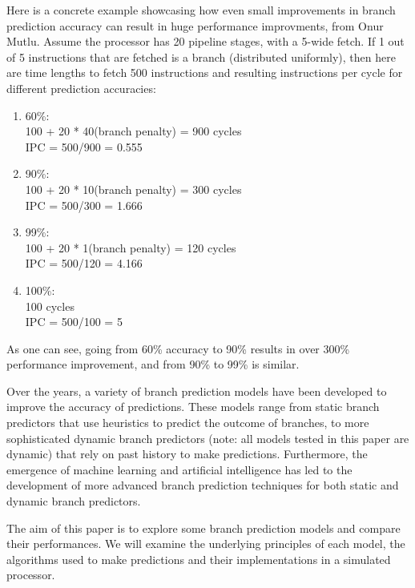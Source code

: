 \documentclass[conference]{IEEEtran}
\begin{document}
Here is a concrete example showcasing how even small improvements in branch prediction accuracy can result in huge performance improvments, from Onur Mutlu\cite{mutlu2023}. Assume the processor has 20 pipeline stages, with a 5-wide fetch. If 1 out of 5 instructions that are fetched is a branch (distributed uniformly), then here are time lengths to fetch 500 instructions and resulting instructions per cycle for different prediction accuracies:
\begin{enumerate}
    \item 60\%:\\
    100 + 20 * 40(branch penalty) = 900 cycles\\
    IPC = 500/900 = 0.555\\
    \item 90\%:\\
    100 + 20 * 10(branch penalty) = 300 cycles\\
    IPC = 500/300 = 1.666\\
    \item 99\%:\\
    100 + 20 * 1(branch penalty) = 120 cycles\\
    IPC = 500/120 = 4.166\\
    \item 100\%:\\
    100 cycles\\
    IPC = 500/100 = 5\\
\end{enumerate}
As one can see, going from 60\% accuracy to 90\% results in over 300\% performance improvement, and from 90\% to 99\% is similar.


Over the years, a variety of branch prediction models have been developed to improve the accuracy of predictions. These models range from static branch predictors that use heuristics to predict the outcome of branches, to more sophisticated dynamic branch predictors (note: all models tested in this paper are dynamic) that rely on past history to make predictions. Furthermore, the emergence of  machine learning and artificial intelligence has led to the development of more advanced branch prediction techniques for both static and dynamic branch predictors.

The aim of this paper is to explore some branch prediction models and compare their performances. We will examine the underlying principles of each model, the algorithms used to make predictions and their implementations in a simulated processor.
\end{document}
